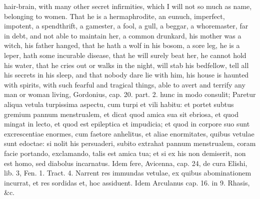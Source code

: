 {hair-brain, with many other secret infirmities, which I will not so
much as name, belonging to women. That he is a hermaphrodite, an
eunuch, imperfect, impotent, a spendthrift, a gamester, a fool, a gull,
a beggar, a whoremaster, far in debt, and not able to maintain her, a
common drunkard, his mother was a witch, his father hanged, that he
hath a wolf in his bosom, a sore leg, he is a leper, hath some
incurable disease, that he will surely beat her, he cannot hold his
water, that he cries out or walks in the night, will stab his
bedfellow, tell all his secrets in his sleep, and that nobody dare lie
with him, his house is haunted with spirits, with such fearful and
tragical things, able to avert and terrify any man or woman living,
Gordonius, cap. 20. part. 2. hunc in modo consulit; Paretur aliqua
vetula turpissima aspectu, cum turpi et vili habitu: et portet subtus
gremium pannum menstrualem, et dicat quod amica sua sit ebriosa, et
quod mingat in lecto, et quod est epileptica et impudicia; et quod in
corpore suo sunt excrescentiae enormes, cum faetore anhelitus, et aliae
enormitates, quibus vetulae sunt edoctae: si nolit his persuaderi,
subito extrahat pannum menstrualem, coram facie portando,
exclamando, talis est amica tua; et si ex his non demiserit, non est
homo, sed diabolus incarnatus. Idem fere, Avicenna, cap. 24, de cura
Elishi, lib. 3, Fen. 1. Tract. 4. Narrent res immundas vetulae, ex
quibus abominationem incurrat, et res sordidas et, hoc assiduent.
Idem Arculanus cap. 16. in 9. Rhasis, \&c.

}
